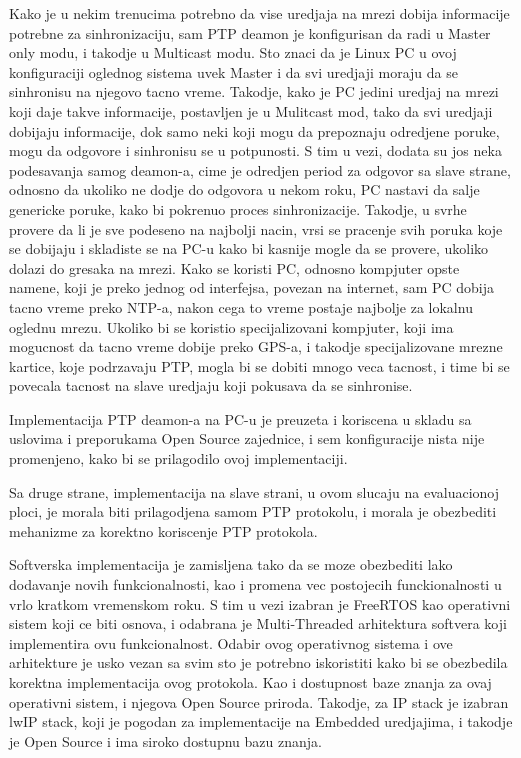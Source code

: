 \documentclass[a4paper,12pt, master]{etf}
\begin{document}
    Kako je u nekim trenucima potrebno da vise uredjaja na mrezi dobija informacije potrebne za
    sinhronizaciju, sam PTP deamon je konfigurisan da radi u Master only modu, i takodje u Multicast modu.
    Sto znaci da je Linux PC u ovoj konfiguraciji oglednog sistema uvek Master i da svi uredjaji moraju da se
    sinhronisu na njegovo tacno vreme. Takodje, kako je PC jedini uredjaj na mrezi koji daje takve
    informacije, postavljen je u Mulitcast mod, tako da svi uredjaji dobijaju informacije, dok samo neki koji
    mogu da prepoznaju odredjene poruke, mogu da odgovore i sinhronisu se u potpunosti. S tim u vezi, dodata
    su jos neka podesavanja samog deamon-a, cime je odredjen period za odgovor sa slave strane, odnosno da
    ukoliko ne dodje do odgovora u nekom roku, PC nastavi da salje genericke poruke, kako bi pokrenuo proces
    sinhronizacije. Takodje, u svrhe provere da li je sve podeseno na najbolji nacin, vrsi se pracenje svih
    poruka koje se dobijaju i skladiste se na PC-u kako bi kasnije mogle da se provere, ukoliko dolazi do
    gresaka na mrezi. Kako se koristi PC, odnosno kompjuter opste namene, koji je preko jednog od interfejsa,
    povezan na internet, sam PC dobija tacno vreme preko NTP-a, nakon cega to vreme postaje najbolje za
    lokalnu oglednu mrezu. Ukoliko bi se koristio specijalizovani kompjuter, koji ima mogucnost da tacno
    vreme dobije preko GPS-a, i takodje specijalizovane mrezne kartice, koje podrzavaju PTP, mogla bi se
    dobiti mnogo veca tacnost, i time bi se povecala tacnost na slave uredjaju koji pokusava da se sinhronise.

    Implementacija PTP deamon-a na PC-u je preuzeta i koriscena u skladu sa uslovima i preporukama Open
    Source zajednice, i sem konfiguracije nista nije promenjeno, kako bi se prilagodilo ovoj implementaciji.

    Sa druge strane, implementacija na slave strani, u ovom slucaju na evaluacionoj ploci, je morala biti
    prilagodjena samom PTP protokolu, i morala je obezbediti mehanizme za korektno koriscenje PTP protokola.

    Softverska implementacija je zamisljena tako da se moze obezbediti lako dodavanje novih funkcionalnosti,
    kao i promena vec postojecih funckionalnosti u vrlo kratkom vremenskom roku. S tim u vezi izabran je
    FreeRTOS kao operativni sistem koji ce biti osnova, i odabrana je Multi-Threaded arhitektura softvera
    koji implementira ovu funkcionalnost. Odabir ovog operativnog sistema i ove arhitekture je usko vezan sa
    svim sto je potrebno iskoristiti kako bi se obezbedila korektna implementacija ovog protokola. Kao i
    dostupnost baze znanja za ovaj operativni sistem, i njegova Open Source priroda. Takodje, za IP stack je
    izabran lwIP stack, koji je pogodan za implementacije na Embedded uredjajima, i takodje je Open Source i
    ima siroko dostupnu bazu znanja.
\end{document}

